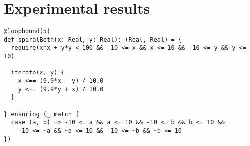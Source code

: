 \section{Experimental results}

\begin{lstlisting}
@loopbound(5)
def spiralBoth(x: Real, y: Real): (Real, Real) = {
  require(x*x + y*y < 100 && -10 <= x && x <= 10 && -10 <= y && y <= 10)

  iterate(x, y) {
    x <== (9.9*x - y) / 10.0
    y <== (9.9*y + x) / 10.0
  }

} ensuring (_ match {
  case (a, b) => -10 <= a && a <= 10 && -10 <= b && b <= 10 &&
    -10 <= ~a && ~a <= 10 && -10 <= ~b && ~b <= 10
})
\end{lstlisting}

